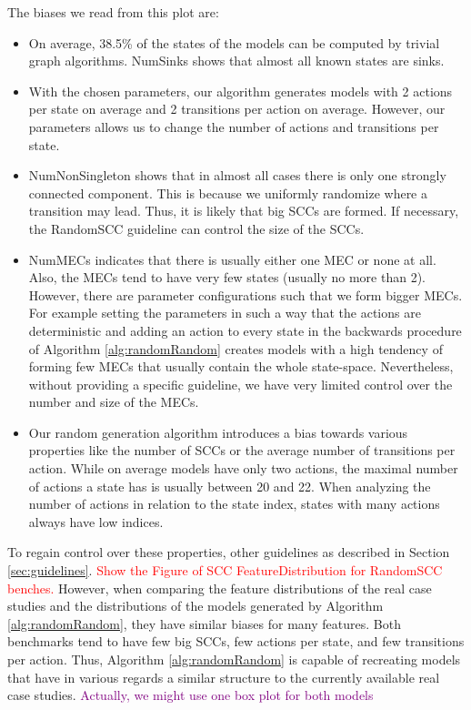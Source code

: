 The biases we read from this plot are:
\begin{itemize} \label{insights:randomRandom}
    \item On average, 38.5\% of the states of the models can be computed by trivial graph algorithms. NumSinks shows that almost all known states are sinks.
    \item With the chosen parameters, our algorithm generates models with 2 actions per state on average
     and 2 transitions per action on average.     
     However, our parameters allows us to change the number of actions and transitions per state.
    \item NumNonSingleton shows that in almost all cases there is only one strongly connected component.
        This is because we uniformly randomize where a transition may lead. Thus, it is likely that big SCCs are formed. 
        If necessary, the RandomSCC guideline can control the size of the SCCs.
    \item NumMECs indicates that there is usually either one MEC or none at all. Also, the MECs tend to have very few states (usually no more than 2).
    However, there are parameter configurations such that we form bigger MECs. For example setting the parameters in such a way that the actions are deterministic
    and adding an action to every state in the backwards procedure of Algorithm \ref{alg:randomRandom} creates models with a high tendency of forming few MECs that usually contain the whole state-space.
    Nevertheless, without providing a specific guideline, we have very limited control over the number and size of the MECs.
    \item Our random generation algorithm introduces a bias towards various properties like the number of SCCs or the average number of transitions per action.
    While on average models have only two actions, the maximal number of actions a state has is usually between 20 and 22.
    When analyzing the number of actions in relation to the state index, states with many actions always have low indices.
\end{itemize}



To regain control over these properties, other guidelines as described in Section \ref{sec:guidelines}.
\textcolor{red}{Show the Figure of SCC FeatureDistribution for RandomSCC benches.}
However, when comparing the feature distributions of the real case studies and the distributions of the models generated by Algorithm \ref{alg:randomRandom},
they have similar biases for many features. Both benchmarks tend to have few big SCCs, few actions per state, and few transitions per action.
Thus, Algorithm \ref{alg:randomRandom} is capable of recreating models that have in various regards a similar structure to the currently available real case studies. 
\textcolor{purple}{Actually, we might use one box plot for both models}

